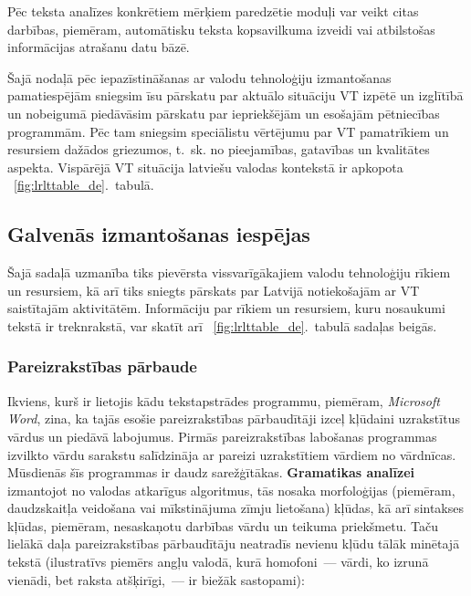 \begin{multicols}{2}
Pēc teksta analīzes konkrētiem mērķiem paredzētie moduļi var veikt citas darbības, piemēram, automātisku teksta kopsavilkuma izveidi vai atbilstošas informācijas atrašanu datu bāzē. 

Šajā nodaļā pēc iepazīstināšanas ar valodu tehnoloģiju izmantošanas pamatiespējām sniegsim īsu pārskatu par aktuālo situāciju VT izpētē un izglītībā un nobeigumā piedāvāsim pārskatu par iepriekšējām un esošajām pētniecības programmām. 
Pēc tam sniegsim speciālistu vērtējumu par VT pamatrīkiem un resursiem dažādos griezumos, t.~sk. no pieejamības, gatavības un kvalitātes aspekta. 
Vispārējā VT situācija latviešu valodas kontekstā ir apkopota ~\ref{fig:lrlttable_de}.~tabulā.

\subsection{Galvenās izmantošanas iespējas}

Šajā sadaļā uzmanība tiks pievērsta vissvarīgākajiem valodu tehnoloģiju rīkiem un resursiem, kā arī tiks sniegts pārskats par Latvijā notiekošajām ar VT saistītajām aktivitātēm.
Informāciju par rīkiem un resursiem, kuru nosaukumi tekstā ir treknrakstā, var skatīt arī ~\ref{fig:lrlttable_de}.~tabulā sadaļas beigās.  


\subsubsection{Pareizrakstības pārbaude}

Ikviens, kurš ir lietojis kādu tekstapstrādes programmu, piemēram, \textit{Microsoft Word}, zina, ka tajās esošie pareizrakstības pārbaudītāji izceļ kļūdaini uzrakstītus vārdus un piedāvā labojumus.
Pirmās pareizrakstības labošanas programmas izvilkto vārdu sarakstu salīdzināja ar pareizi uzrakstītiem vārdiem no vārdnīcas.
Mūsdienās šīs programmas ir daudz sarežģītākas.
\textbf{Gramatikas analīzei} izmantojot no valodas atkarīgus algoritmus, tās nosaka morfoloģijas (piemēram, daudzskaitļa veidošana vai mīkstinājuma zīmju lietošana) kļūdas, kā arī sintakses kļūdas, piemēram, nesaskaņotu darbības vārdu un teikuma priekšmetu.
Taču lielākā daļa pareizrakstības pārbaudītāju neatradīs nevienu kļūdu tālāk minētajā tekstā (ilustratīvs piemērs angļu valodā, kurā homofoni~--- vārdi, ko izrunā vienādi, bet raksta atšķirīgi,~--- ir biežāk sastopami):


\end{multicols}
